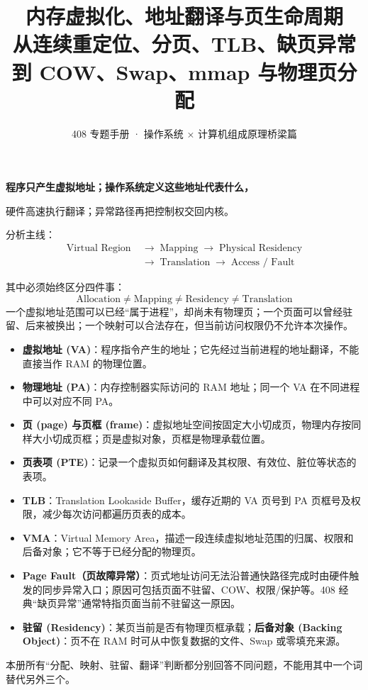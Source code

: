 \documentclass[11pt,a4paper]{ctexart}
\title{\vspace{-1.2cm}\textbf{内存虚拟化、地址翻译与页生命周期}\\[0.35em]
\large 从连续重定位、分页、TLB、缺页异常到 COW、Swap、mmap 与物理页分配}
\author{408 专题手册 · 操作系统 × 计算机组成原理桥梁篇}
\date{}
\newcommand{\kw}[1]{\textbf{#1}}
\newcommand{\arr}{\;\longrightarrow\;}
\begin{document}
\maketitle

\begin{corebox}
\begin{center}
\Large\bfseries 程序只产生虚拟地址；操作系统定义这些地址代表什么，\par
硬件高速执行翻译；异常路径再把控制权交回内核。
\end{center}

分析主线：
\[
\boxed{
\begin{aligned}
\text{Virtual Region} &\arr \text{Mapping} \arr \text{Physical Residency} \\
&\arr \text{Translation} \arr \text{Access / Fault}
\end{aligned}
}
\]

其中必须始终区分四件事：
\[
\boxed{
\text{Allocation}
\neq
\text{Mapping}
\neq
\text{Residency}
\neq
\text{Translation}
}
\]
一个虚拟地址范围可以已经“属于进程”，却尚未有物理页；一个页面可以曾经驻留、后来被换出；一个映射可以合法存在，但当前访问权限仍不允许本次操作。
\end{corebox}

\begin{method}
\begin{itemize}[leftmargin=1.5em]
  \item \kw{虚拟地址 (VA)}：程序指令产生的地址；它先经过当前进程的地址翻译，不能直接当作 RAM 的物理位置。
  \item \kw{物理地址 (PA)}：内存控制器实际访问的 RAM 地址；同一个 VA 在不同进程中可以对应不同 PA。
  \item \kw{页 (page) 与页框 (frame)}：虚拟地址空间按固定大小切成页，物理内存按同样大小切成页框；页是虚拟对象，页框是物理承载位置。
  \item \kw{页表项 (PTE)}：记录一个虚拟页如何翻译及其权限、有效位、脏位等状态的表项。
  \item \kw{TLB}：Translation Lookaside Buffer，缓存近期的 VA 页号到 PA 页框号及权限，减少每次访问都遍历页表的成本。
  \item \kw{VMA}：Virtual Memory Area，描述一段连续虚拟地址范围的归属、权限和后备对象；它不等于已经分配的物理页。
  \item \kw{Page Fault（页故障异常）}：页式地址访问无法沿普通快路径完成时由硬件触发的同步异常入口；原因可包括页面不驻留、COW、权限/保护等。408 经典“缺页异常”通常特指页面当前不驻留这一原因。
  \item \kw{驻留 (Residency)}：某页当前是否有物理页框承载；\kw{后备对象 (Backing Object)}：页不在 RAM 时可从中恢复数据的文件、Swap 或零填充来源。
\end{itemize}
本册所有“分配、映射、驻留、翻译”判断都分别回答不同问题，不能用其中一个词替代另外三个。
\end{method}
\end{document}

